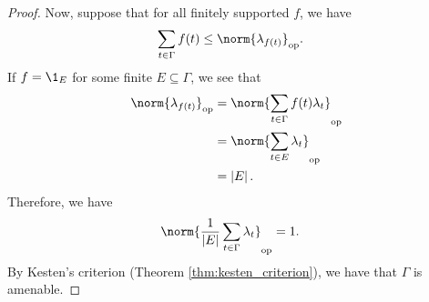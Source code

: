 \begin{proof}
  Now, suppose that for all finitely supported $f$, we have
  \begin{align*}
    \sum_{t\in\Gamma}f(t) &\leq \norm{\lambda_{f(t)}}_{\op}.
  \end{align*}
  If $f = \1_{E}$ for some finite $E\subseteq \Gamma$, we see that
  \begin{align*}
    \norm{\lambda_{f(t)}}_{\op} &= \norm{\sum_{t\in\Gamma}f(t)\lambda_t}_{\op}\\
                                &= \norm{\sum_{t\in E}\lambda_t}_{\op}\\
                                &= \left\vert E \right\vert.
  \end{align*}
  Therefore, we have
  \begin{align*}
    \norm{\frac{1}{\left\vert E \right\vert}\sum_{t\in\Gamma}\lambda_t}_{\op} &= 1.
  \end{align*}
  By Kesten's criterion (Theorem \ref{thm:kesten_criterion}), we have that $\Gamma$ is amenable.
\end{proof}

